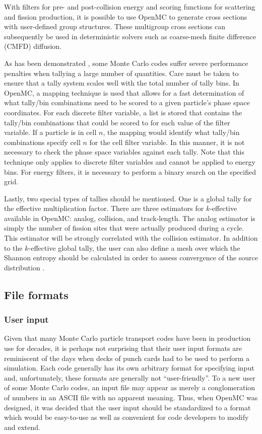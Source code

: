 \documentclass[authoryear,preprint]{elsarticle}
\begin{document}
With filters for pre- and post-collision energy and scoring functions for
scattering and fission production, it is possible to use OpenMC to generate
cross sections with user-defined group structures. These multigroup cross
sections can subsequently be used in deterministic solvers such as coarse-mesh
finite difference (CMFD) diffusion.

As has been demonstrated \citep{mcnp-efficiency}, some Monte Carlo codes suffer
severe performance penalties when tallying a large number of quantities. Care
must be taken to ensure that a tally system scales well with the total number of
tally bins. In OpenMC, a mapping technique is used that allows for a fast
determination of what tally/bin combinations need to be scored to a given
particle's phase space coordinates. For each discrete filter variable, a list is
stored that contains the tally/bin combinations that could be scored to for each
value of the filter variable. If a particle is in cell $n$, the mapping would
identify what tally/bin combinations specify cell $n$ for the cell filter
variable. In this manner, it is not necessary to check the phase space variables
against each tally. Note that this technique only applies to discrete filter
variables and cannot be applied to energy bins. For energy filters, it is
necessary to perform a binary search on the specified grid.

Lastly, two special types of tallies should be mentioned. One is a global tally
for the effective multiplication factor. There are three estimators for
$k$-effective available in OpenMC: analog, collision, and track-length. The
analog estimator is simply the number of fission sites that were actually
produced during a cycle. This estimator will be strongly correlated with the
collision estimator. In addition to the $k$-effective global tally, the user can
also define a mesh over which the Shannon entropy should be calculated in order
to assess convergence of the source distribution \citep{entropy}.

\subsection{File formats}

\subsubsection{User input}

Given that many Monte Carlo particle transport codes have been in production use
for decades, it is perhaps not surprising that their user input formats are
reminiscent of the days when decks of punch cards had to be used to perform a
simulation. Each code generally has its own arbitrary format for specifying
input and, unfortunately, these formats are generally not ``user-friendly''. To
a new user of some Monte Carlo codes, an input file may appear as merely a
conglomeration of numbers in an ASCII file with no apparent meaning. Thus, when
OpenMC was designed, it was decided that the user input should be standardized
to a format which would be easy-to-use as well as convenient for code developers
to modify and extend.
\end{document}
